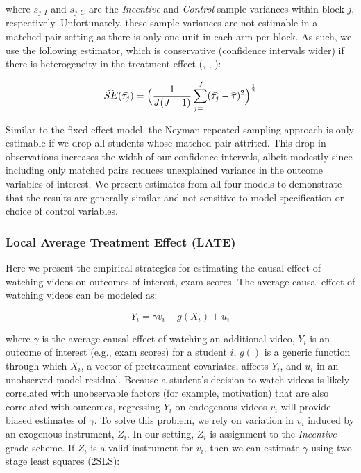 \documentclass[12pt]{article}
\newcommand\wh[1]{\hstretch{2}{\hat{\hstretch{.5}{#1}}}}
\begin{document}
where $s_{j, I}$ and $s_{j, C}$ are the \textit{Incentive} and \textit{Control} sample variances within block $j$, respectively. Unfortunately, these sample variances are not estimable in a matched-pair setting as there is only one unit in each arm per block. As such, we use the following estimator, which is conservative (confidence intervals wider) if there is heterogeneity in the treatment effect (\cite{imai2008}, \cite{ir2015}, \cite{ai2017}):

\begin{equation} \label{se_imai}
	\wh{SE}(\wh{\tau_j}) = \Big(\frac{1}{J(J-1)}\sum_{j=1}^{J} (\wh{\tau_j} - \wh{\tau})^2 \Big)^\frac{1}{2}
\end{equation}

Similar to the fixed effect model, the Neyman repeated sampling approach is only estimable if we drop all students whose matched pair attrited. This drop in observations increases the width of our confidence intervals, albeit modestly since including only matched pairs reduces unexplained variance in the outcome variables of interest. We present estimates from all four models to demonstrate that the results are generally similar and not sensitive to model specification or choice of control variables.

\subsubsection{Local Average Treatment Effect (LATE)}

Here we present the empirical strategies for estimating the causal effect of watching videos on outcomes of interest, exam scores. The average causal effect of watching videos can be modeled as:

\begin{equation} \label{endog_spec}
	Y_i = \gamma v_i + g(X_i) + u_i
\end{equation}

where $\gamma$ is the average causal effect of watching an additional video, $Y_i$ is an outcome of interest (e.g., exam scores) for a student $i$, $g()$ is a generic function through which $X_i$, a vector of pretreatment covariates, affects $Y_i$, and $u_i$ in an unobserved model residual. Because a student's decision to watch videos is likely correlated with unobservable factors (for example, motivation) that are also correlated with outcomes, regressing $Y_i$ on endogenous videos $v_i$ will provide biased estimates of $\gamma$. To solve this problem, we rely on variation in $v_i$ induced by an exogenous instrument, $Z_i$. In our setting, $Z_i$ is assignment to the \textit{Incentive} grade scheme. If $Z_i$ is a valid instrument for $v_i$, then we can estimate $\gamma$ using two-stage least squares (2SLS):
\end{document}
